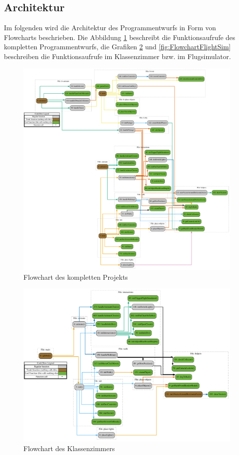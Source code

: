 \subsection{Architektur}
Im folgenden wird die Architektur des Programmentwurfs in Form von Flowcharts beschrieben.
Die Abbildung \ref{fig:FlowchartComplete} beschreibt die Funktionsaufrufe des kompletten Programmentwurfs, die Grafiken
\ref{fig:FlowchartRoot} und \ref{fig:FlowchartFlightSim} beschreiben die Funktionsaufrufe im Klassenzimmer bzw. im Flugsimulator.
\begin{figure}[H]
  \centering
  \includegraphics[width=1\textwidth]{images/flowchart/complete.pdf}
  \caption{Flowchart des kompletten Projekts}
  \label{fig:FlowchartComplete}
\end{figure}\noindent
\begin{figure}[H]
  \centering
  \includegraphics[width=1\textwidth]{images/flowchart/root.pdf}
  \caption{Flowchart des Klassenzimmers}
  \label{fig:FlowchartRoot}
\end{figure}\noindent
